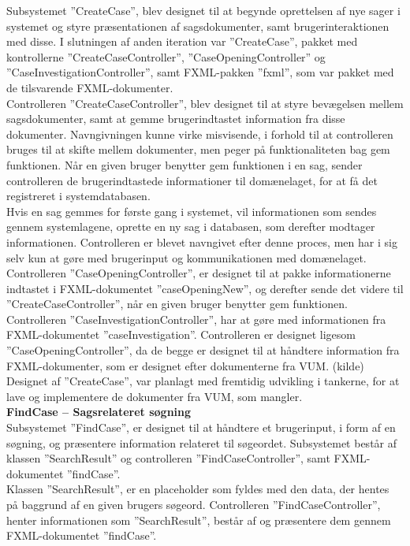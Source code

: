 Subsystemet ”CreateCase”, blev designet til at begynde oprettelsen af nye sager i systemet og styre præsentationen af sagsdokumenter, samt brugerinteraktionen med disse. I slutningen af anden iteration var ”CreateCase”, pakket med kontrollerne ”CreateCaseController”, ”CaseOpeningController” og ”CaseInvestigationController”, samt FXML-pakken ”fxml”, som var pakket med de tilsvarende FXML-dokumenter.\\ 
Controlleren ”CreateCaseController”, blev designet til at styre bevægelsen mellem sagsdokumenter, samt at gemme brugerindtastet information fra disse dokumenter. Navngivningen kunne virke misvisende, i forhold til at controlleren bruges til at skifte mellem dokumenter, men peger på funktionaliteten bag gem funktionen. Når en given bruger benytter gem funktionen i en sag, sender controlleren de brugerindtastede informationer til domænelaget, for at få det registreret i systemdatabasen. \\
Hvis en sag gemmes for første gang i systemet, vil informationen som sendes gennem systemlagene, oprette en ny sag i databasen, som derefter modtager informationen. Controlleren er blevet navngivet efter denne proces, men har i sig selv kun at gøre med brugerinput og kommunikationen med domænelaget.\\
Controlleren ”CaseOpeningController”, er designet til at pakke informationerne indtastet i FXML-dokumentet ”caseOpeningNew”, og derefter sende det videre til ”CreateCaseController”, når en given bruger benytter gem funktionen.\\
Controlleren ”CaseInvestigationController”, har at gøre med informationen fra FXML-dokumentet ”caseInvestigation”. Controlleren er designet ligesom ”CaseOpeningController”, da de begge er designet til at håndtere information fra FXML-dokumenter, som er designet efter dokumenterne fra VUM. (kilde) \\
Designet af ”CreateCase”, var planlagt med fremtidig udvikling i tankerne, for at lave og implementere de dokumenter fra VUM, som mangler.\\
\textbf{FindCase – Sagsrelateret søgning} \\
Subsystemet ”FindCase”, er designet til at håndtere et brugerinput, i form af en søgning, og præsentere information relateret til søgeordet. Subsystemet består af klassen ”SearchResult” og controlleren ”FindCaseController”, samt FXML-dokumentet ”findCase”.\\
Klassen ”SearchResult”, er en placeholder som fyldes med den data, der hentes på baggrund af en given brugers søgeord. Controlleren ”FindCaseController”, henter informationen som ”SearchResult”, består af og præsentere dem gennem FXML-dokumentet ”findCase”.\\
